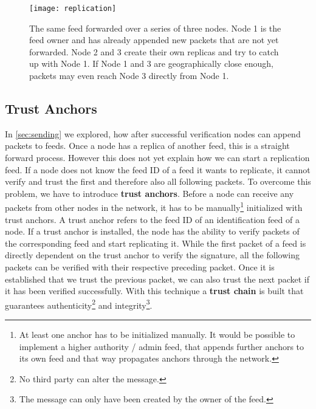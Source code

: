 \begin{figure}
\centering
\texttt{[image: replication]}
\caption{The same feed forwarded over a series of three nodes. Node 1 is the feed owner and has already appended new packets that are not yet forwarded. Node 2 and 3 create their own replicas and try to catch up with Node 1. If Node 1 and 3 are geographically close enough, packets may even reach Node 3 directly from Node 1.}
\label{fig:replication}
\end{figure}

\subsection{Trust Anchors}
\label{sec:anchor}
In \cref{sec:sending} we explored, how after successful verification nodes can append packets to feeds. Once a node has a replica of another feed, this is a straight forward process. However this does not yet explain how we can start a replication feed. If a node does not know the feed ID of a feed it wants to replicate, it cannot verify and trust the first and therefore also all following packets. To overcome this problem, we have to introduce \textbf{trust anchors}. Before a node can receive any packets from other nodes in the network, it has to be manually\footnote{At least one anchor has to be initialized manually. It would be possible to implement a higher authority / admin feed, that appends further anchors to its own feed and that way propagates anchors through the network.} initialized with trust anchors. A trust anchor refers to the feed ID of an identification feed of a node. If a trust anchor is installed, the node has the ability to verify packets of the corresponding feed and start replicating it. While the first packet of a feed is directly dependent on the trust anchor to verify the signature, all the following packets can be verified with their respective preceding packet. Once it is established that we trust the previous packet, we can also trust the next packet if it has been verified successfully. With this technique a \textbf{trust chain} is built that guarantees authenticity\footnote{No third party can alter the message.} and integrity\footnote{The message can only have been created by the owner of the feed.}.~\cite{tinySSB}

